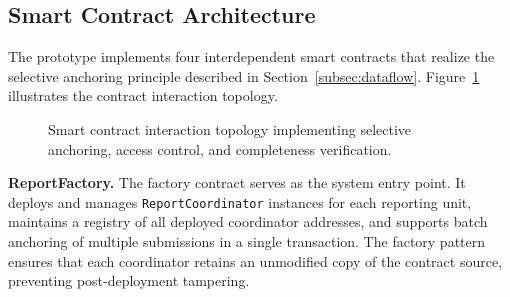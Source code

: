 \subsection{Smart Contract Architecture}\label{subsec:contracts}

The prototype implements four interdependent smart contracts that realize the selective anchoring principle described in Section~\ref{subsec:dataflow}. Figure~\ref{fig:contracts} illustrates the contract interaction topology.

\begin{figure}[!ht]
\centering
{}
\caption{Smart contract interaction topology implementing selective anchoring, access control, and completeness verification.}\label{fig:contracts}
\end{figure}

%
%
%
%

\textbf{ReportFactory.} The factory contract serves as the system entry point. It deploys and manages \texttt{ReportCoordinator} instances for each reporting unit, maintains a registry of all deployed coordinator addresses, and supports batch anchoring of multiple submissions in a single transaction. The factory pattern ensures that each coordinator retains an unmodified copy of the contract source, preventing post-deployment tampering.

